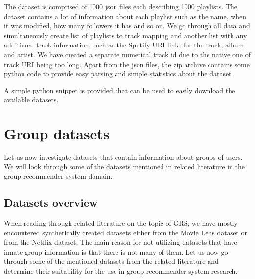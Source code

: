 \begin{itemize}
    The dataset is comprised of 1000 json files each describing 1000 playlists. The dataset contains a lot of information about each playlist such as the name, when it was modified, how many followers it has and so on. We go through all data and simultaneously create list of playlists to track mapping and another list with any additional track information, such as the Spotify URI links for the track, album and artist. We have created a separate numerical track id due to the native one of track URI being too long. Apart from the json files, the zip archive contains some python code to provide easy parsing and simple statistics about the dataset.
    
\end{itemize}







A simple python snippet is provided that can be used to easily download the available datasets.


\section{Group datasets}
Let us now investigate datasets that contain information about groups of users. We will look through some of the datasets mentioned in related literature in the group recommender system domain.

\subsection{Datasets overview}\label{subsection:04_}

When reading through related literature on the topic of GRS, we have mostly encountered synthetically created datasets either from the Movie Lens dataset or from the Netflix dataset. The main reason for not utilizing datasets that have innate group information is that there is not many of them. Let us now go through some of the mentioned datasets from the related literature and determine their suitability for the use in group recommender system research.

